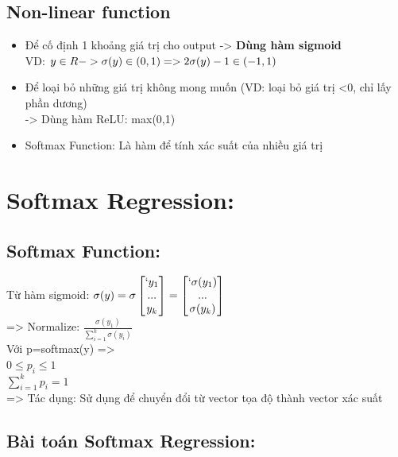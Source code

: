 \documentclass{article}
\begin{document}
\subsection{Non-linear function}
\begin{itemize}
    \item Để cố định 1 khoảng giá trị cho output -> \textbf{Dùng hàm sigmoid}\\
    VD: $y \in R -> \sigma(y) \in (0,1) \\
    => 2\sigma(y) - 1 \in (-1,1)$
    \item Để loại bỏ những giá trị không mong muốn (VD: loại bỏ giá trị <0, chỉ lấy phần dương) \\
    -> Dùng hàm ReLU: max(0,1)
    \item Softmax Function: Là hàm để tính xác suất của nhiều giá trị 
\end{itemize}

\section{Softmax Regression:}
\subsection{Softmax Function:}
Từ hàm sigmoid: $\sigma (y) = \sigma \begin{bmatrix}
    `       y_1\\
            ...\\
            y_k
            \end{bmatrix}
            = \begin{bmatrix}
    `       \sigma (y_1)\\
            ...\\
            \sigma (y_k)
            \end{bmatrix}$ \\
=> Normalize: $\frac{\sigma (y_1)}{\sum_{i=1}^{k} \sigma (y_i)}$\\
Với p=softmax(y) => \\ $0\leq p_i \leq 1$ \\ $\sum_{i=1}^{k} p_i=1$ \\
=> Tác dụng: Sử dụng để chuyển đổi từ vector tọa độ thành vector xác suất
\subsection{Bài toán Softmax Regression:}
\end{document}
